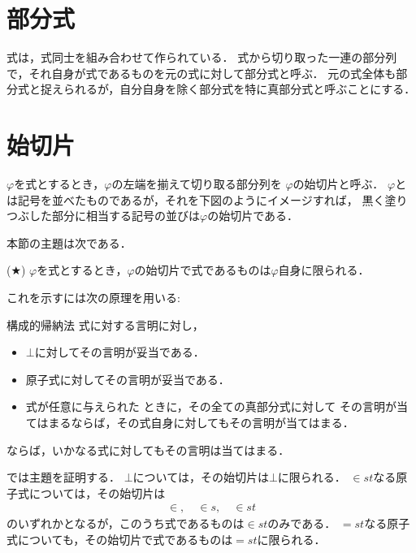 \documentclass[a4j,10.5pt,oneside,openany]{jsbook}
\begin{document}
\section{部分式}
	式は，式同士を組み合わせて作られている．
	式から切り取った一連の部分列で，それ自身が式であるものを元の式に対して部分式と呼ぶ．
	元の式全体も部分式と捉えられるが，自分自身を除く部分式を特に真部分式と呼ぶことにする．
	
\section{始切片}
	$\varphi$を式とするとき，$\varphi$の左端を揃えて切り取る部分列を
	$\varphi$の始切片と呼ぶ．
	$\varphi$とは記号を並べたものであるが，それを下図のようにイメージすれば，
	黒く塗りつぶした部分に相当する記号の並びは$\varphi$の始切片である．
	
	\begin{center}
	\end{center}
	
	本節の主題は次である．
	\begin{screen}
		(★) $\varphi$を式とするとき，$\varphi$の始切片で式であるものは$\varphi$自身に限られる．
	\end{screen}
	
	これを示すには次の原理を用いる:
	\begin{itembox}[l]{構成的帰納法}
		式に対する言明に対し，
		\begin{itemize}
			\item $\bot$に対してその言明が妥当である．
			\item 原子式に対してその言明が妥当である．
			\item 式が任意に与えられた\footnotemark
				ときに，その全ての真部分式に対して
				その言明が当てはまるならば，その式自身に対してもその言明が当てはまる．
		\end{itemize}
		ならば，いかなる式に対してもその言明は当てはまる．
	\end{itembox}
	
	
	では主題を証明する．
	$\bot$については，その始切片は$\bot$に限られる．
	$\in st$なる原子式については，その始切片は
	\begin{align}
		\in, \quad \in s, \quad \in st
	\end{align}
	のいずれかとなるが，このうち式であるものは$\in st$のみである．
	$=st$なる原子式についても，その始切片で式であるものは$=st$に限られる．
	
\end{document}
